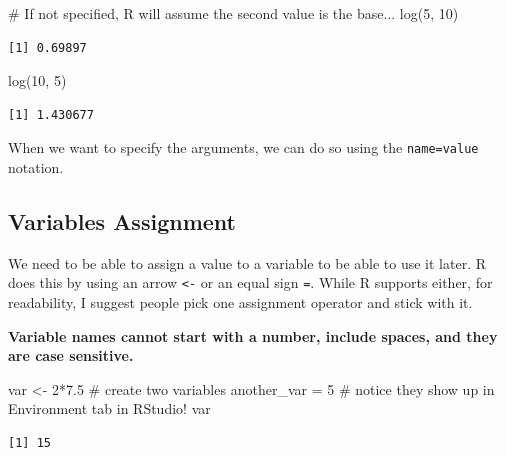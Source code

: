 \documentclass[
  letterpaper,
  DIV=11,
  numbers=noendperiod]{scrreprt}
\newenvironment{Shaded}{\begin{snugshade}}{\end{snugshade}}
\newcommand{\CommentTok}[1]{\textcolor[rgb]{0.37,0.37,0.37}{#1}}
\newcommand{\DecValTok}[1]{\textcolor[rgb]{0.68,0.00,0.00}{#1}}
\newcommand{\FloatTok}[1]{\textcolor[rgb]{0.68,0.00,0.00}{#1}}
\newcommand{\FunctionTok}[1]{\textcolor[rgb]{0.28,0.35,0.67}{#1}}
\newcommand{\NormalTok}[1]{\textcolor[rgb]{0.00,0.23,0.31}{#1}}
\newcommand{\OtherTok}[1]{\textcolor[rgb]{0.00,0.23,0.31}{#1}}
\newcommand{\SpecialCharTok}[1]{\textcolor[rgb]{0.37,0.37,0.37}{#1}}
\begin{document}
\begin{Shaded}
\begin{Highlighting}[]
\CommentTok{\# If not specified, R will assume the second value is the base...}
\FunctionTok{log}\NormalTok{(}\DecValTok{5}\NormalTok{, }\DecValTok{10}\NormalTok{)}
\end{Highlighting}
\end{Shaded}

\begin{verbatim}
[1] 0.69897
\end{verbatim}

\begin{Shaded}
\begin{Highlighting}[]
\FunctionTok{log}\NormalTok{(}\DecValTok{10}\NormalTok{, }\DecValTok{5}\NormalTok{)}
\end{Highlighting}
\end{Shaded}

\begin{verbatim}
[1] 1.430677
\end{verbatim}

When we want to specify the arguments, we can do so using the
\texttt{name=value} notation.

\subsection{Variables Assignment}\label{variables-assignment}

We need to be able to assign a value to a variable to be able to use it
later. R does this by using an arrow \texttt{\textless{}-} or an equal
sign \texttt{=}. While R supports either, for readability, I suggest
people pick one assignment operator and stick with it.

\textbf{Variable names cannot start with a number, include spaces, and
they are case sensitive.}

\begin{Shaded}
\begin{Highlighting}[]
\NormalTok{var }\OtherTok{\textless{}{-}} \DecValTok{2}\SpecialCharTok{*}\FloatTok{7.5}       \CommentTok{\# create two variables}
\NormalTok{another\_var }\OtherTok{=} \DecValTok{5}   \CommentTok{\# notice they show up in \textquotesingle{}Environment\textquotesingle{} tab in RStudio!}
\NormalTok{var }
\end{Highlighting}
\end{Shaded}

\begin{verbatim}
[1] 15
\end{verbatim}
\end{document}
